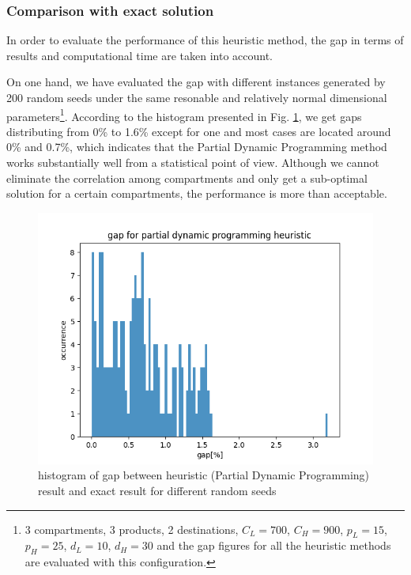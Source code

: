 \documentclass{article}
\begin{document}
\subsubsection{Comparison with exact solution}
In order to evaluate the performance of this heuristic method, the gap in terms of results and computational time are taken into account.

On one hand, we have evaluated the gap with different instances generated by 200 random seeds under the same resonable and relatively normal dimensional parameters\footnote{3 compartments, 3 products, 2 destinations, $C_L=700$, $C_H=900$, $p_L=15$, $p_H=25$, $d_L=10$, $d_H=30$ and the gap figures for all the heuristic methods are evaluated with this configuration.}. According to the histogram presented in Fig. \ref{fig:hist_pdp}, we get gaps distributing from 0\% to 1.6\% except for one and most cases are located around 0\% and 0.7\%, which indicates that the Partial Dynamic Programming method works substantially well from a statistical point of view. Although we cannot eliminate the correlation among compartments and only get a sub-optimal solution for a certain compartments, the performance is more than acceptable.

\begin{figure}[ht]
    \centering
    \includegraphics[scale=0.7]{hist_pdp.png}
    \caption{histogram of gap between heuristic (Partial Dynamic Programming) result and exact result for different random seeds}
    \label{fig:hist_pdp}
\end{figure}
\end{document}
